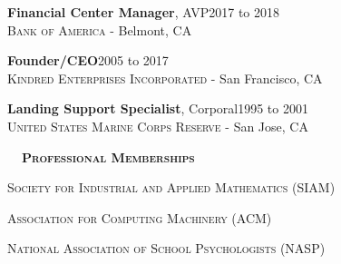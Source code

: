 \documentclass[hidelinks, 10pt]{article}
\def\contentspacing{2.5mm}          %
\def\sectionspacing{6mm}            %
\def\sectiontocontentspacing{4mm}   %
\renewcommand{\section}[1]{
    {\fontsize{14}{14}\selectfont \textsc{\textbf{\ \ #1\ \ }}}\hrulefill
}
\begin{document}
{\vspace{\contentspacing}

\begin{minipage}[ct]{0.9\linewidth}
    \textbf{Financial Center Manager}, AVP\hfill 2017 to 2018\\
    {\textsc{Bank of America} - Belmont, CA}
\end{minipage}

\vspace{\contentspacing}

\begin{minipage}[ct]{0.9\linewidth}
    \textbf{Founder/CEO}\hfill 2005 to 2017\\
    {\textsc{Kindred Enterprises Incorporated} - San Francisco, CA}
\end{minipage}

\vspace{\contentspacing}

\begin{minipage}[ct]{0.9\linewidth}
    \textbf{Landing Support Specialist}, Corporal\hfill 1995 to 2001\\
    {\textsc{United States Marine Corps Reserve} - San Jose, CA}
\end{minipage}

\vspace{\sectionspacing}


\section{Professional Memberships}
\vspace{\sectiontocontentspacing}

\begin{minipage}[ct]{0.9\linewidth}
    \textsc{Society for Industrial and Applied Mathematics} (SIAM)
\end{minipage}

\vspace{0.5mm}

\begin{minipage}[ct]{0.9\linewidth}
    \textsc{Association for Computing Machinery} (ACM)
\end{minipage}

\vspace{0.5mm}

\begin{minipage}[ct]{0.9\linewidth}
    \textsc{National Association of School Psychologists} (NASP)
\end{minipage}

}
\end{document}
